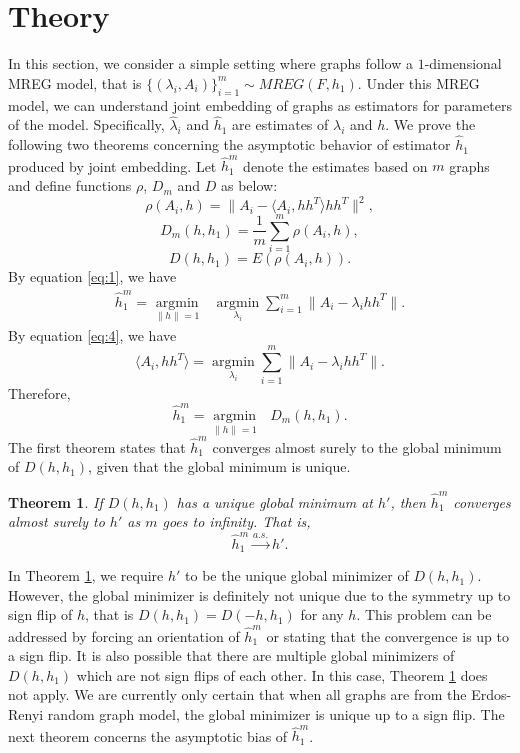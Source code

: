 \documentclass[10pt,journal,compsoc]{IEEEtran}
\newtheorem{theorem}{Theorem}[section]
\begin{document}
\section{Theory}
In this section, we consider a simple setting where graphs follow a $1$-dimensional MREG model, that is $\{(\lambda_i,A_i)\} _{i=1}^m \sim MREG(F,h_1)$. Under this MREG model, we can understand joint embedding of graphs as estimators for parameters of the model. Specifically, $\hat{\lambda}_i$ and $\hat{h}_1$ are estimates of $\lambda_i$ and $h$. We prove the following two theorems concerning the asymptotic behavior of estimator $\hat{h}_1$ produced by joint embedding. Let $\hat{h}_1^m$ denote the estimates based on $m$ graphs and define functions $\rho$, $D_m$ and $D$ as below: 
\[ \rho(A_i,h)= \|A_i- \langle A_i,h h^T \rangle h h^T\|^2, \]
\[ D_m(h,h_1) =\frac{1}{m}\sum_{i=1}^{m} \rho(A_i,h), \]
\[ D(h,h_1) = E(\rho(A_i,h)). \]
By equation \eqref{eq:1}, we have
\begin{align*} 
\hat{h}_1^m = \underset{\|h\| =1}{\operatorname{argmin}} \text{ }   \underset{\lambda_i}{\operatorname{argmin}} \sum_{i=1}^{m} \|A_i - \lambda_i h h^T\| .
\end{align*}
By equation \eqref{eq:4}, we have 
\[\langle A_i,hh^T \rangle=\underset{\lambda_i}{\operatorname{argmin}} \sum_{i=1}^{m} \|A_i - \lambda_i h h^T\|.\]
Therefore,
\[\hat{h}_1^m = \underset{\|h\| =1}{\operatorname{argmin}} \text{ } D_m(h,h_1). \]
The first theorem states that $\hat{h}_1^m$  converges almost surely to the global minimum of $D(h,h_1)$, given that the global minimum is unique.
\begin{theorem}
\label{thm:1}
If $D(h,h_1)$ has a unique global minimum at $h'$, then $\hat{h}_1^m$ converges almost surely to $h'$ as $m$ goes to infinity. That is, 
\[ \hat{h}_1^m \overset{a.s.}{\rightarrow} h'. \]
\end{theorem}

\noindent In Theorem \ref{thm:1}, we require $h'$ to be the unique global minimizer of $D(h,h_1)$. However, the global minimizer is definitely not unique due to the symmetry up to sign flip of $h$, that is $D(h,h_1)=D(-h,h_1)$ for any $h$. This problem can be addressed by forcing an orientation of $\hat{h}_1^m$ or stating that the convergence is up to a sign flip. It is also possible that there are multiple global minimizers of $D(h,h_1)$ which are not sign flips of each other. In this case, Theorem \ref{thm:1} does not apply. We are currently only certain that when all graphs are from the Erdos-Renyi random graph model, the global minimizer is unique up to a sign flip. The next theorem concerns the asymptotic bias of $\hat{h}_1^m$. 
\end{document}
